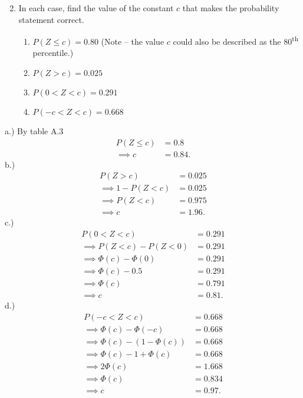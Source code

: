 \documentclass{report}
\begin{document}
 \pagebreak \bigbreak \noindent 
 \begin{mdframed}
     \begin{enumerate}[label=\arabic*.]
         \setcounter{enumi}{1}
         \item In each case, find the value of the constant \( c \) that makes the probability statement correct.
             \begin{enumerate}[label=(\alph*)]
                 \item \( P(Z \leq c) = 0.80 \) (Note – the value \( c \) could also be described as the 80\textsuperscript{th} percentile.)
                 \item \( P(Z > c) = 0.025 \)
                 \item \( P(0 < Z < c) = 0.291 \)
                 \item \( P(-c < Z < c) = 0.668 \)
             \end{enumerate}
     \end{enumerate}
 \end{mdframed}
 \bigbreak \noindent 
 a.) By table A.3
 \begin{align*}
     P(Z \leq c ) &= 0.8 \\
     \implies c &= 0.84
 .\end{align*}
 \bigbreak \noindent 
 b.) 
 \begin{align*}
     P(Z > c) &= 0.025 \\
     \implies 1-P(Z < c) &= 0.025 \\
     \implies P(Z < c) &=0.975 \\
     \implies c &= 1.96
 .\end{align*}
 \bigbreak \noindent 
 c.) 
 \begin{align*}
     P( 0 < Z < c) &= 0.291 \\
     \implies P(Z < c) - P(Z < 0) &= 0.291 \\
     \implies \Phi(c) - \Phi(0) &= 0.291 \\
     \implies \Phi(c) - 0.5 &= 0.291 \\
     \implies \Phi(c) &= 0.791 \\
     \implies c &= 0.81
 .\end{align*}
 \bigbreak \noindent 
 d.) 
 \begin{align*}
     P(-c < Z < c) &= 0.668 \\
     \implies \Phi(c) - \Phi(-c) &=0.668 \\
     \implies \Phi(c) - (1-\Phi(c)) &= 0.668 \\
     \implies \Phi(c) -1 + \Phi(c) &= 0.668 \\
     \implies 2\Phi(c) &= 1.668 \\
     \implies \Phi(c) &= 0.834 \\
     \implies c &= 0.97
 .\end{align*}
\end{document}
